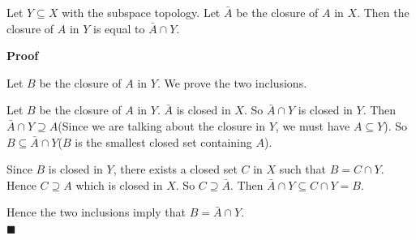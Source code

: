 \documentclass[main.tex]{subfiles}
\begin{document}
\begin{theorem}
    Let $Y \subseteq X$ with the subspace topology. Let $\bar{A}$ be the closure of $A$ in $X$. Then the closure of $A$ in $Y$ is equal to $\bar{A} \cap Y$.
\end{theorem}
\par \noindent \textbf{Proof} 
\par Let $B$ be the closure of $A$ in $Y$. We prove the two inclusions. 
\par Let $B$ be the closure of $A$ in $Y$. $\bar{A}$ is closed in $X$. So $\bar{A} \cap Y$ is closed in $Y$. Then $\bar{A} \cap Y \supseteq A$(Since we are talking about the closure in $Y$, we must have $A \subseteq Y$). So $B \subseteq \bar{A} \cap Y$($B$ is the smallest closed set containing $A$). 
\par Since $B$ is closed in $Y$, there exists a closed set $C$ in $X$ such that \(B = C \cap Y\). Hence $C \supseteq A$ which is closed in $X$. So $C \supseteq \bar{A}$. Then $\bar{A} \cap Y \subseteq C \cap Y = B$. 
\par Hence the two inclusions imply that $B = \bar{A} \cap Y$. 
\\ \null \hfill $\blacksquare$  
\end{document}
